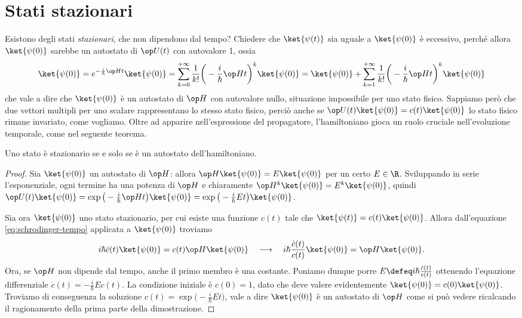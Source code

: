 \section{Stati stazionari}
Esistono degli stati \emph{stazionari}, che non dipendono dal tempo?
Chiedere che $\ket{\psi(t)}$ sia uguale a $\ket{\psi(0)}$ è eccessivo, perch\'e allora $\ket{\psi(0)}$ sarebbe un autostato di $\op U(t)$ con autovalore 1, ossia
\begin{equation}
	\ket{\psi(0)}=e^{-\frac{i}{\hbar}\op Ht}\ket{\psi(0)}=\sum_{k=0}^{+\infty}\frac1{k!}\bigg(-\frac{i}{\hbar}\op Ht\bigg)^k\ket{\psi(0)}=\ket{\psi(0)}+\sum_{k=1}^{+\infty}\frac1{k!}\bigg(-\frac{i}{\hbar}\op Ht\bigg)^k\ket{\psi(0)}
\end{equation}
che vale a dire che $\ket{\psi(0)}$ è un autostato di $\op H$ con autovalore nullo, situazione impossibile per uno stato fisico.
Sappiamo però che due vettori multipli per uno scalare rappresentano lo stesso stato fisico, perciò anche se $\op U(t)\ket{\psi(0)}=c(t)\ket{\psi(0)}$ lo stato fisico rimane invariato, come vogliamo.
Oltre ad apparire nell'espressione del propagatore, l'hamiltoniano gioca un ruolo cruciale nell'evoluzione temporale, come nel seguente teorema.
\begin{teorema} \label{t:autostati-hamiltoniano-stazionari}
	Uno stato è stazionario se e solo se è un autostato dell'hamiltoniano.
\end{teorema}
\begin{proof}
	Sia $\ket{\psi(0)}$ un autostato di $\op H$: allora $\op H\ket{\psi(0)}=E\ket{\psi(0)}$ per un certo $E\in\R$.
	Sviluppando in serie l'esponenziale, ogni termine ha una potenza di $\op H$ e chiaramente $\op H^k\ket{\psi(0)}=E^k\ket{\psi(0)}$, quindi $\op U(t)\ket{\psi(0)}=\exp\big(-\frac{i}{\hbar}\op Ht\big)\ket{\psi(0)}=\exp\big(-\frac{i}{\hbar}Et\big)\ket{\psi(0)}$.

	Sia ora $\ket{\psi(0)}$ uno stato stazionario, per cui esiste una funzione $c(t)$ tale che $\ket{\psi(t)}=c(t)\ket{\psi(0)}$.
	Allora dall'equazione \eqref{eq:schrodinger-tempo} applicata a $\ket{\psi(0)}$ troviamo
	\begin{equation}
		i\hbar\dot{c}(t)\ket{\psi(0)}=c(t)\op H\ket{\psi(0)}\quad\longrightarrow\quad i\hbar\frac{\dot{c}(t)}{c(t)}\ket{\psi(0)}=\op H\ket{\psi(0)}.
	\end{equation}
	Ora, se $\op H$ non dipende dal tempo, anche il primo membro è una costante.
	Poniamo dunque porre $E\defeq i\hbar\frac{\dot{c}(t)}{c(t)}$ ottenendo l'equazione differenziale $\dot{c}(t)=-\frac{i}{\hbar}Ec(t)$.
	La condizione iniziale è $c(0)=1$, dato che deve valere evidentemente $\ket{\psi(0)}=c(0)\ket{\psi(0)}$.
	Troviamo di conseguenza la soluzione $c(t)=\exp\big(-\frac{i}{\hbar}Et\big)$, vale a dire $\ket{\psi(0)}$ è un autostato di $\op H$ come si può vedere ricalcando il ragionamento della prima parte della dimostrazione.
\end{proof}

